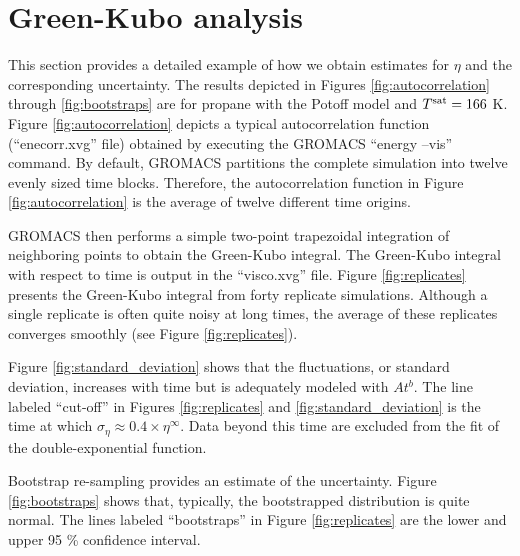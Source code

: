 \documentclass[preprint,review,12pt]{elsarticle}
\begin{document}

    \clearpage
	\newpage
	
	\section{Green-Kubo analysis} \label{SI:GK_analysis}
	
	This section provides a detailed example of how we obtain estimates for $\eta$ and the corresponding uncertainty. The results depicted in Figures \ref{fig:autocorrelation} through \ref{fig:bootstraps} are for propane with the Potoff model and $T^{\rm sat} = 166$ K. Figure \ref{fig:autocorrelation} depicts a typical autocorrelation function (``enecorr.xvg'' file) obtained by executing the GROMACS ``energy --vis'' command. By default, GROMACS partitions the complete simulation into twelve evenly sized time blocks. Therefore, the autocorrelation function in Figure \ref{fig:autocorrelation} is the average of twelve different time origins. 
	
	GROMACS then performs a simple two-point trapezoidal integration of neighboring points to obtain the Green-Kubo integral. The Green-Kubo integral with respect to time is output in the ``visco.xvg'' file. Figure \ref{fig:replicates} presents the Green-Kubo integral from forty replicate simulations. Although a single replicate is often quite noisy at long times, the average of these replicates converges smoothly (see Figure \ref{fig:replicates}). 
	
	Figure \ref{fig:standard_deviation} shows that the fluctuations, or standard deviation, increases with time but is adequately modeled with $A t^{b}$. The line labeled ``cut-off'' in Figures \ref{fig:replicates} and \ref{fig:standard_deviation} is the time at which $\sigma_{\eta} \approx 0.4 \times \eta^\infty$. Data beyond this time are excluded from the fit of the double-exponential function. 
	
	Bootstrap re-sampling provides an estimate of the uncertainty. Figure \ref{fig:bootstraps} shows that, typically, the bootstrapped distribution is quite normal. The lines labeled ``bootstraps'' in Figure \ref{fig:replicates} are the lower and upper 95 \% confidence interval.
	
\end{document}
